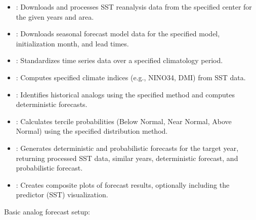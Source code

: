 \documentclass[letterpaper,10pt,english]{sphinxmanual}
\begin{document}
\sphinxAtStartPar
{}
\begin{itemize}
\item {} 
\sphinxAtStartPar
{}: Downloads and processes SST reanalysis data from the specified center for the given years and area.

\item {} 
\sphinxAtStartPar
{}: Downloads seasonal forecast model data for the specified model, initialization month, and lead times.

\item {} 
\sphinxAtStartPar
{}: Standardizes time series data over a specified climatology period.

\item {} 
\sphinxAtStartPar
{}: Computes specified climate indices (e.g., NINO34, DMI) from SST data.

\item {} 
\sphinxAtStartPar
{}: Identifies historical analogs using the specified method and computes deterministic forecasts.

\item {} 
\sphinxAtStartPar
{}: Calculates tercile probabilities (Below Normal, Near Normal, Above Normal) using the specified distribution method.

\item {} 
\sphinxAtStartPar
{}: Generates deterministic and probabilistic forecasts for the target year, returning processed SST data, similar years, deterministic forecast, and probabilistic forecast.

\item {} 
\sphinxAtStartPar
{}: Creates composite plots of forecast results, optionally including the predictor (SST) visualization.

\end{itemize}

\sphinxAtStartPar
{}

\sphinxAtStartPar
Basic analog forecast setup:
\end{document}
